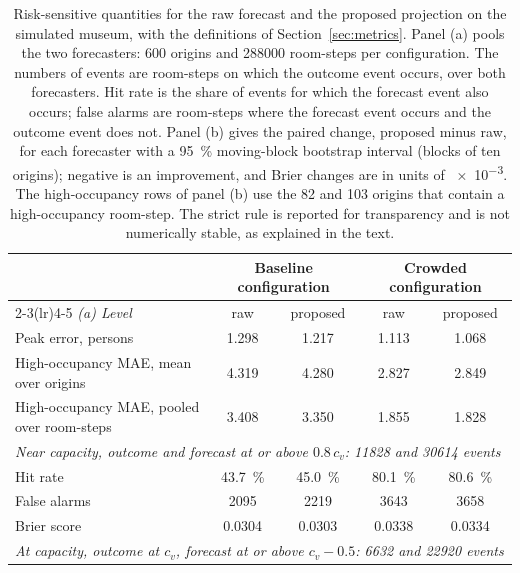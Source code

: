 \documentclass[utf8]{FrontiersinHarvard}
\newif\ifsecondrevisionmarkup
\newcommand{\rev}[1]{\ifsecondrevisionmarkup\textcolor{revisiontwo}{#1}\else#1\fi}
\newcommand{\revcolor}{\ifsecondrevisionmarkup\color{revisiontwo}\fi}
\theoremstyle{plain}
\theoremstyle{definition}
\theoremstyle{remark}
\begin{document}
\rev{\begin{table}[htbp]
\centering
\revcolor
\caption{\rev{Risk-sensitive quantities for the raw forecast and the proposed projection on the simulated museum, with the definitions of Section~\ref{sec:metrics}. Panel (a) pools the two forecasters: \num{600} origins and \num{288000} room-steps per configuration. The numbers of events are room-steps on which the outcome event occurs, over both forecasters. Hit rate is the share of events for which the forecast event also occurs; false alarms are room-steps where the forecast event occurs and the outcome event does not. Panel (b) gives the paired change, proposed minus raw, for each forecaster with a \SI{95}{\percent} moving-block bootstrap interval (blocks of ten origins); negative is an improvement, and Brier changes are in units of \num{e-3}. The high-occupancy rows of panel (b) use the \num{82} and \num{103} origins that contain a high-occupancy room-step. The strict rule is reported for transparency and is not numerically stable, as explained in the text.}}
\label{tab:risk}
\scriptsize
\setlength{\tabcolsep}{4pt}
\begin{tabular}{lcccc}
\toprule
& \multicolumn{2}{c}{Baseline configuration} & \multicolumn{2}{c}{Crowded configuration} \\
\cmidrule(lr){2-3}\cmidrule(lr){4-5}
\emph{(a) Level} & raw & proposed & raw & proposed \\
\midrule
Peak error, persons                         & 1.298 & 1.217 & 1.113 & 1.068 \\
High-occupancy MAE, mean over origins       & 4.319 & 4.280 & 2.827 & 2.849 \\
High-occupancy MAE, pooled over room-steps  & 3.408 & 3.350 & 1.855 & 1.828 \\
\midrule
\multicolumn{5}{l}{\emph{Near capacity, outcome and forecast at or above $0.8\,c_v$: \num{11828} and \num{30614} events}}\\
\quad Hit rate                              & \SI{43.7}{\percent} & \SI{45.0}{\percent} & \SI{80.1}{\percent} & \SI{80.6}{\percent} \\
\quad False alarms                          & \num{2095} & \num{2219} & \num{3643} & \num{3658} \\
\quad Brier score                           & 0.0304 & 0.0303 & 0.0338 & 0.0334 \\
\midrule
\multicolumn{5}{l}{\emph{At capacity, outcome at $c_v$, forecast at or above $c_v - 0.5$: \num{6632} and \num{22920} events}}\\

\end{tabular}
\end{table}}
\end{document}
